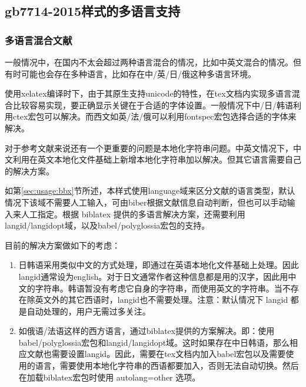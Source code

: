 \begin{enumerate}
%
%
%
%

\end{enumerate}





\subsection{gb7714-2015样式的多语言支持}\label{sec:multilan:implement}

\subsubsection{多语言混合文献}

一般情况中，在国内不太会超过两种语言混合的情况，比如中英文混合的情况。但有时可能也会存在多种语言，比如存在中/英/日/俄这种多语言环境。

使用xelatex编译时下，由于其原生支持unicode的特性，在tex文档内实现多语言混合比较容易实现，要正确显示关键在于合适的字体设置。一般情况下中/日/韩语利用ctex宏包可以解决。而西文如英/法/俄可以利用fontspec宏包选择合适的字体来解决。

对于参考文献来说还有一个更重要的问题是本地化字符串问题。中英文情况下，中文利用在英文本地化文件基础上新增本地化字符串加以解决。但其它语言需要自己的解决方案。

如第\ref{sec:usage:bbx}节所述，本样式使用language域来区分文献的语言类型，默认情况下该域不需要人工输入，可由biber根据文献信息自动判断，但也可以手动输入来人工指定。根据 biblatex 提供的多语言解决方案，还需要利用langid/langidopt域，以及babel/polyglossia宏包的支持。

目前的解决方案做如下的考虑：
\begin{enumerate}
  \item 日韩语采用类似中文的方式处理，即通过在英语本地化文件基础上处理。因此langid通常设为english。对于日文通常作者这种信息都是用的汉字，因此用中文的字符串。韩语暂没有考虑它自身的字符串，而使用英文的字符串。当不存在除英文外的其它西语时，langid也不需要处理。注意：默认情况下 langid 都是自动处理的，用户无需过多关注。
  \item 如俄语/法语这样的西方语言，通过biblatex提供的方案解决。即：使用babel/polyglossia宏包和langid/langidopt域。这时如果存在中日韩语，那么相应文献也需要设置langid。因此，需要在tex文档内加入babel宏包以及需要使用的语言，需要使用本地化字符串的西语都要加入，否则无法自动切换。然后在加载biblatex宏包时使用 autolang=other 选项。
\end{enumerate}

